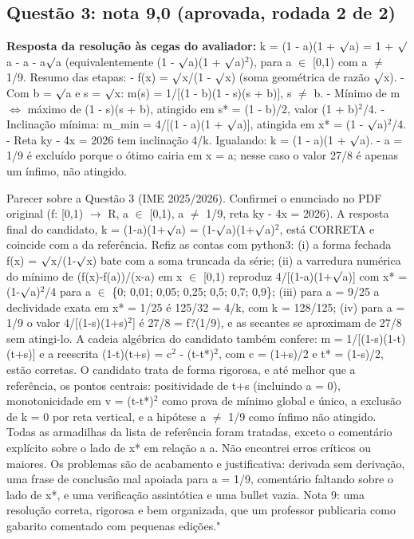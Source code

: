 \documentclass{article}%
\begin{document}
\subsection*{Questão 3: nota 9,0 (aprovada, rodada 2 de 2)}%
\textbf{Resposta da resolução às cegas do avaliador:} k = (1 - a)(1 + $\surd$a) = 1 + $\surd$a - a - a$\surd$a (equivalentemente (1 - $\surd$a)(1 + $\surd$a)$^2$), para a $\in$ {[}0,1) com a $\neq$ 1/9.\newline%
\newline%
Resumo das etapas:\newline%
{-} f(x) = $\surd$x/(1 - $\surd$x) (soma geométrica de razão $\surd$x).\newline%
{-} Com b = $\surd$a e s = $\surd$x: m(s) = 1/{[}(1 - b)(1 - s)(s + b){]}, s $\neq$ b.\newline%
{-} Mínimo de m $\Leftrightarrow$ máximo de (1 - s)(s + b), atingido em s* = (1 - b)/2, valor (1 + b)$^2$/4.\newline%
{-} Inclinação mínima: m\_min = 4/{[}(1 - a)(1 + $\surd$a){]}, atingida em x* = (1 - $\surd$a)$^2$/4.\newline%
{-} Reta ky - 4x = 2026 tem inclinação 4/k. Igualando: k = (1 - a)(1 + $\surd$a).\newline%
{-} a = 1/9 é excluído porque o ótimo cairia em x = a; nesse caso o valor 27/8 é apenas um ínfimo, não atingido.\par %
Parecer sobre a Questão 3 (IME 2025/2026). Confirmei o enunciado no PDF original (f: {[}0,1) $\to$ R, a $\in$ {[}0,1), a $\neq$ 1/9, reta ky - 4x = 2026). A resposta final do candidato, k = (1-a)(1+$\surd$a) = (1-$\surd$a)(1+$\surd$a)$^2$, está CORRETA e coincide com a da referência. Refiz as contas com python3: (i) a forma fechada f(x) = $\surd$x/(1-$\surd$x) bate com a soma truncada da série; (ii) a varredura numérica do mínimo de (f(x)-f(a))/(x-a) em x $\in$ {[}0,1) reproduz 4/{[}(1-a)(1+$\surd$a){]} com x* = (1-$\surd$a)$^2$/4 para a $\in$ \{0; 0,01; 0,05; 0,25; 0,5; 0,7; 0,9\}; (iii) para a = 9/25 a declividade exata em x* = 1/25 é 125/32 = 4/k, com k = 128/125; (iv) para a = 1/9 o valor 4/{[}(1-s)(1+s)$^2${]} é 27/8 = f?(1/9), e as secantes se aproximam de 27/8 sem atingi{-}lo. A cadeia algébrica do candidato também confere: m = 1/{[}(1-s)(1-t)(t+s){]} e a reescrita (1-t)(t+s) = c$^2$ - (t-t*)$^2$, com c = (1+s)/2 e t* = (1-s)/2, estão corretas. O candidato trata de forma rigorosa, e até melhor que a referência, os pontos centrais: positividade de t+s (incluindo a = 0), monotonicidade em v = (t-t*)$^2$ como prova de mínimo global e único, a exclusão de k = 0 por reta vertical, e a hipótese a $\neq$ 1/9 como ínfimo não atingido. Todas as armadilhas da lista de referência foram tratadas, exceto o comentário explícito sobre o lado de x* em relação a a. Não encontrei erros críticos ou maiores. Os problemas são de acabamento e justificativa: derivada sem derivação, uma frase de conclusão mal apoiada para a = 1/9, comentário faltando sobre o lado de x*, e uma verificação assintótica e uma bullet vazia. Nota 9: uma resolução correta, rigorosa e bem organizada, que um professor publicaria como gabarito comentado com pequenas edições."%
\end{document}
